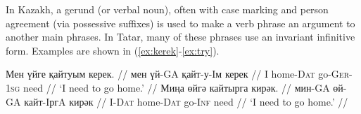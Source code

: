 \documentclass[a4paper,11pt]{article}
\newcommand{\gmk}[1]{{\qipb\scshape #1}}
\newcommand{\eng}[1]{`#1'}
\begin{document}
In Kazakh, a gerund (or verbal noun), often with case marking and person agreement (via possessive suffixes) is used to make a verb phrase an argument to another main phrases.  In Tatar, many of these phrases use an invariant infinitive form.  Examples are shown in (\ref{ex:kerek}-\ref{ex:try}).
\vspace{-1ex}
%



\pex[everygla=,everyglb=,everyglc=,aboveglbskip=0pt,aboveglftskip=0ex]  %
\vspace{-1.5ex}
\label{ex:kerek}
\begingl
\gla Мен үйге қайтуым керек. //
\glb мен үй-GA қайт-у-Iм керек //
\glb I home-\gmk{Dat} go-\gmk{Ger}-\gmk{1sg} need //
\glft \eng{I need to go home.} //
\endgl
\xe
\pex[everygla=,everyglb=,everyglc=,aboveglbskip=0pt,aboveglftskip=0ex]  %
\vspace{-1.5ex}
\begingl
\gla Миңа өйгә кайтырга кирәк. //
\glb мин-GA өй-GA кайт-IргA кирәк //
\glb I-\gmk{Dat} home-\gmk{Dat} go-\gmk{Inf} need //
\glft \eng{I need to go home.} //
\endgl
\xe
\end{document}
